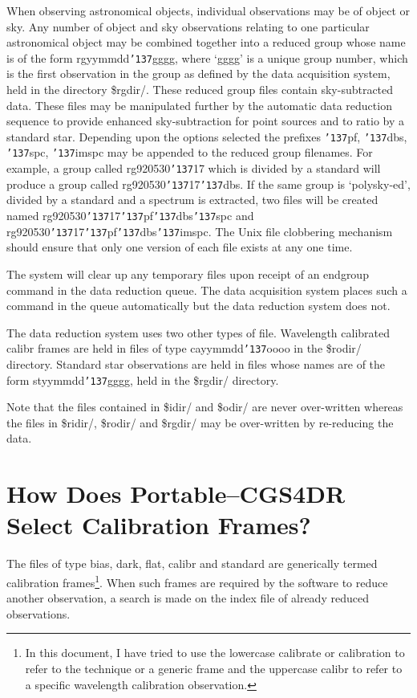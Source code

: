 \documentclass[a4paper]{book}
\renewcommand{\_}{{\tt\char'137}}
\begin{document}
When observing astronomical objects, individual observations may be of
{\sc object} or {\sc sky}. Any number of {\sc object} and {\sc sky}
observations relating to one particular astronomical object may be
combined together into a reduced group whose name is of the form
rgyymmdd\_gggg, where `gggg' is a unique group number, which is the first
observation in the group as defined by the data acquisition system, held
in the directory {\sc \$rgdir/}. These reduced group files contain
sky-subtracted data. These files may be manipulated further by the
automatic data reduction sequence to provide enhanced sky-subtraction for
point sources and to ratio by a standard star.  Depending upon the options
selected the prefixes \_pf, \_dbs, \_spc, \_imspc may be appended to the
reduced group filenames. For example, a group called rg920530\_17 which is
divided by a standard will produce a group called rg920530\_17\_dbs. If
the same group is `polysky-ed', divided by a standard and a spectrum is
extracted, two files will be created named rg920530\_17\_pf\_dbs\_spc and
rg920530\_17\_pf\_dbs\_imspc. The Unix file clobbering mechanism should
ensure that only one version of each file exists at any one time.

The system will clear up any temporary files upon receipt of an {\sc
endgroup} command in the data reduction queue. The data acquisition system
places such a command in the queue automatically but the data reduction
system does not.

The data reduction system uses two other types of file. Wavelength
calibrated {\sc calibr} frames are held in files of type cayymmdd\_oooo in
the {\sc \$rodir/} directory. Standard star observations are held in files
whose names are of the form styymmdd\_gggg, held in the {\sc \$rgdir/}
directory.

Note that the files contained in {\sc \$idir/} and {\sc \$odir/} are never
over-written whereas the files in {\sc \$ridir/}, {\sc \$rodir/} and {\sc
\$rgdir/} may be over-written by re-reducing the data.

\section{How Does Portable--CGS4DR Select Calibration Frames?}
The files of type {\sc bias}, {\sc dark}, {\sc flat}, {\sc calibr} and
{\sc standard} are generically termed calibration frames\footnote[2]{In
this document, I have tried to use the lowercase calibrate or calibration
to refer to the technique or a generic frame and the uppercase {\sc
calibr} to refer to a specific wavelength calibration observation.}. When
such frames are required by the software to reduce another observation, a
search is made on the index file of already reduced observations.
\end{document}
